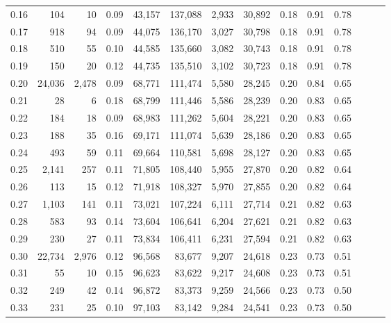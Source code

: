 \begin{tabular}{rrrrrrrrrrrrrr}
0.16 &     104 &     10 &  0.09 &   43,157 &  137,088 &   2,933 &  30,892 &  0.18 &  0.91 &      0.78 \\
0.17 &     918 &     94 &  0.09 &   44,075 &  136,170 &   3,027 &  30,798 &  0.18 &  0.91 &      0.78 \\
0.18 &     510 &     55 &  0.10 &   44,585 &  135,660 &   3,082 &  30,743 &  0.18 &  0.91 &      0.78 \\
0.19 &     150 &     20 &  0.12 &   44,735 &  135,510 &   3,102 &  30,723 &  0.18 &  0.91 &      0.78 \\
0.20 &  24,036 &  2,478 &  0.09 &   68,771 &  111,474 &   5,580 &  28,245 &  0.20 &  0.84 &      0.65 \\
0.21 &      28 &      6 &  0.18 &   68,799 &  111,446 &   5,586 &  28,239 &  0.20 &  0.83 &      0.65 \\
0.22 &     184 &     18 &  0.09 &   68,983 &  111,262 &   5,604 &  28,221 &  0.20 &  0.83 &      0.65 \\
0.23 &     188 &     35 &  0.16 &   69,171 &  111,074 &   5,639 &  28,186 &  0.20 &  0.83 &      0.65 \\
0.24 &     493 &     59 &  0.11 &   69,664 &  110,581 &   5,698 &  28,127 &  0.20 &  0.83 &      0.65 \\
0.25 &   2,141 &    257 &  0.11 &   71,805 &  108,440 &   5,955 &  27,870 &  0.20 &  0.82 &      0.64 \\
0.26 &     113 &     15 &  0.12 &   71,918 &  108,327 &   5,970 &  27,855 &  0.20 &  0.82 &      0.64 \\
0.27 &   1,103 &    141 &  0.11 &   73,021 &  107,224 &   6,111 &  27,714 &  0.21 &  0.82 &      0.63 \\
0.28 &     583 &     93 &  0.14 &   73,604 &  106,641 &   6,204 &  27,621 &  0.21 &  0.82 &      0.63 \\
0.29 &     230 &     27 &  0.11 &   73,834 &  106,411 &   6,231 &  27,594 &  0.21 &  0.82 &      0.63 \\
0.30 &  22,734 &  2,976 &  0.12 &   96,568 &   83,677 &   9,207 &  24,618 &  0.23 &  0.73 &      0.51 \\
0.31 &      55 &     10 &  0.15 &   96,623 &   83,622 &   9,217 &  24,608 &  0.23 &  0.73 &      0.51 \\
0.32 &     249 &     42 &  0.14 &   96,872 &   83,373 &   9,259 &  24,566 &  0.23 &  0.73 &      0.50 \\
0.33 &     231 &     25 &  0.10 &   97,103 &   83,142 &   9,284 &  24,541 &  0.23 &  0.73 &      0.50 \\

\end{tabular}
